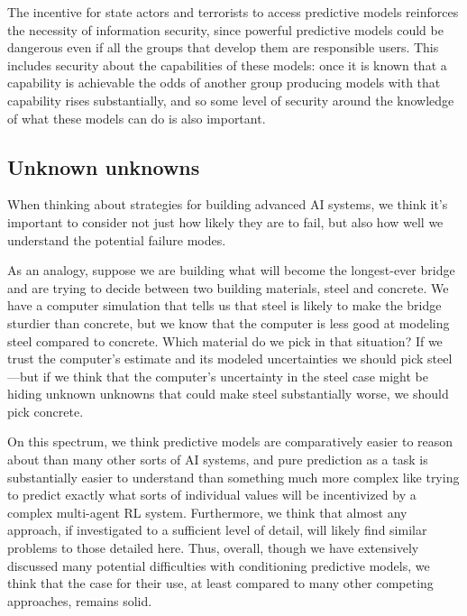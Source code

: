 {{The incentive for state actors and terrorists to access predictive models reinforces the necessity of information security, since powerful predictive models could be dangerous even if all the groups that develop them are responsible users. This includes security about the capabilities of these models: once it is known that a capability is achievable the odds of another group producing models with that capability rises substantially, and so some level of security around the knowledge of what these models can do is also important.


\subsection{Unknown unknowns}

When thinking about strategies for building advanced AI systems, we think it's important to consider not just how likely they are to fail, but also how well we understand the potential failure modes.

As an analogy, suppose we are building what will become the longest-ever bridge and are trying to decide between two building materials, steel and concrete. We have a computer simulation that tells us that steel is likely to make the bridge sturdier than concrete, but we know that the computer is less good at modeling steel compared to concrete. Which material do we pick in that situation? If we trust the computer's estimate and its modeled uncertainties we should pick steel---but if we think that the computer's uncertainty in the steel case might be hiding unknown unknowns that could make steel substantially worse, we should pick concrete.

On this spectrum, we think predictive models are comparatively easier to reason about than many other sorts of AI systems, and pure prediction as a task is substantially easier to understand than something much more complex like trying to predict exactly what sorts of individual values will be incentivized by a complex multi-agent RL system. Furthermore, we think that almost any approach, if investigated to a sufficient level of detail, will likely find similar problems to those detailed here. Thus, overall, though we have extensively discussed many potential difficulties with conditioning predictive models, we think that the case for their use, at least compared to many other competing approaches, remains solid.





}}
